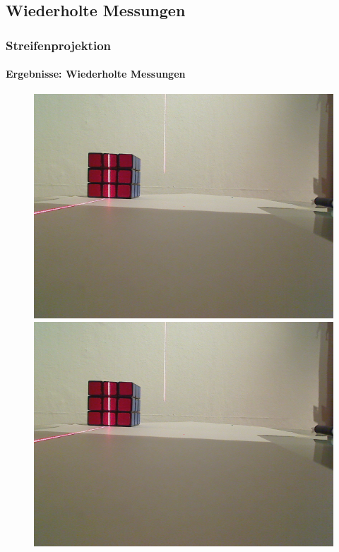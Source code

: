 \documentclass[xcolor=dvipsnames]{beamer}
\begin{document}
\subsection{Wiederholte Messungen}
\begin{frame}
	\frametitle{Streifenprojektion}
	\framesubtitle{Ergebnisse: Wiederholte Messungen}
	
	\begin{figure}
		\begin{minipage}{0.32\linewidth}
			\includegraphics[width=\linewidth]{includes/test_repeat_1}
		\end{minipage}
		\hfill
		\begin{minipage}{0.32\linewidth}
			\includegraphics[width=\linewidth]{includes/test_repeat_2}

\end{minipage}
\end{figure}
\end{frame}
\end{document}
